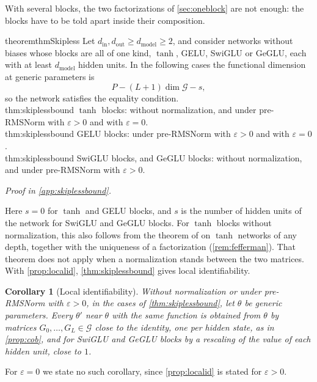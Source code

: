 \documentclass[10pt]{article}
\newtheorem{corollary}[theorem]{Corollary}
\theoremstyle{definition}
\theoremstyle{remark}
\newcommand{\dm}{d_{\mathrm{model}}}
\newcommand{\G}{\mathcal{G}}
\newcommand{\ptlabel}[1]{\phantomsection\label{#1}}
\newcommand{\proofin}[1]{\par\vspace{-0.4\baselineskip}\noindent\hfill{\small\itshape Proof in \cref{#1}.}\par\smallskip}
\newcommand{\stpart}[3]{\ifx\relax#1\relax\else\ptlabel{#1:#2}\fi{\upshape\bfseries\boldmath(#2)\ifx\relax#3\relax\else\ #3.\fi}}
\begin{document}
With several blocks, the two factorizations of \cref{sec:oneblock} are not enough: the blocks have to be told apart inside their composition.

\begin{restatable}{theorem}{thmSkipless}\label{thm:skiplessbound}\label{thm:epszeroskipless}
Let $d_{\mathrm{in}}, d_{\mathrm{out}} \ge \dm \ge 2$, and consider networks without biases whose blocks are all of one kind, $\tanh$, GELU, SwiGLU or GeGLU, each with at least $\dm$ hidden units. In the following cases the functional dimension at generic parameters is
\[
P - (L+1)\dim\G - s ,
\]
so the network satisfies the equality condition.\\
\stpart{thm:skiplessbound}{i}{} $\tanh$ blocks: without normalization, and under pre-RMSNorm with $\varepsilon > 0$ and with $\varepsilon = 0$.\\
\stpart{thm:skiplessbound}{ii}{} GELU blocks: under pre-RMSNorm with $\varepsilon > 0$ and with $\varepsilon = 0$.\\
\stpart{thm:skiplessbound}{iii}{} SwiGLU blocks, and GeGLU blocks: without normalization, and under pre-RMSNorm with $\varepsilon > 0$.
\end{restatable}
\proofin{app:skiplessbound}

Here $s = 0$ for $\tanh$ and GELU blocks, and $s$ is the number of hidden units of the network for SwiGLU and GeGLU blocks. For $\tanh$ blocks without normalization, this also follows from the theorem of \citet{fefferman1994} on $\tanh$ networks of any depth, together with the uniqueness of a factorization (\cref{rem:fefferman}). That theorem does not apply when a normalization stands between the two matrices. With \cref{prop:localid}, \cref{thm:skiplessbound} gives local identifiability.

\begin{corollary}[Local identifiability]\label{cor:skiplesslocalid}
Without normalization or under pre-RMSNorm with $\varepsilon > 0$, in the cases of \cref{thm:skiplessbound}, let $\theta$ be generic parameters. Every $\theta'$ near $\theta$ with the same function is obtained from $\theta$ by matrices $G_0, \dots, G_L \in \G$ close to the identity, one per hidden state, as in \cref{prop:cob}, and for SwiGLU and GeGLU blocks by a rescaling of the value of each hidden unit, close to $1$.
\end{corollary}

For $\varepsilon = 0$ we state no such corollary, since \cref{prop:localid} is stated for $\varepsilon > 0$.
\end{document}
